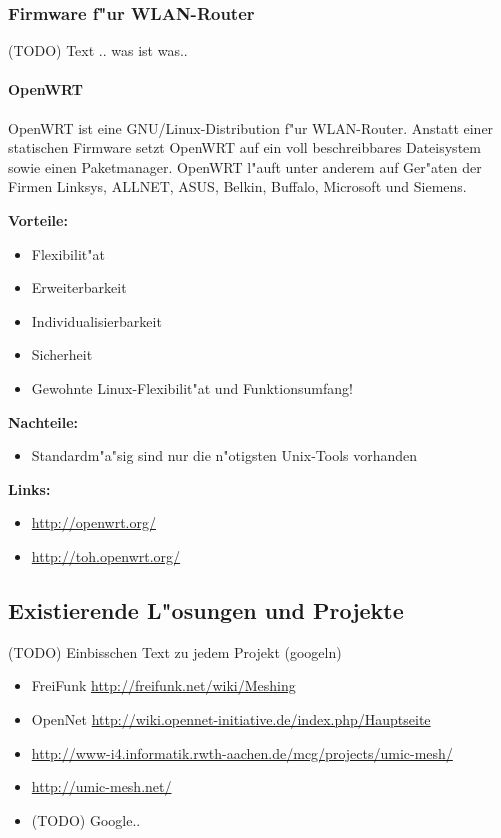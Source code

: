 \subsubsection{Firmware f"ur WLAN-Router}

(TODO) Text .. was ist was..

\paragraph{OpenWRT}

OpenWRT ist eine GNU/Linux-Distribution f"ur WLAN-Router. Anstatt einer
statischen Firmware setzt OpenWRT auf ein voll beschreibbares Dateisystem
sowie einen Paketmanager. OpenWRT l"auft unter anderem auf Ger"aten der
Firmen Linksys, ALLNET, ASUS, Belkin, Buffalo, Microsoft und Siemens.

\textbf{Vorteile:}

\begin{itemize}
	\item Flexibilit"at
	\item Erweiterbarkeit
	\item Individualisierbarkeit
	\item Sicherheit
	\item Gewohnte Linux-Flexibilit"at und Funktionsumfang! 
\end{itemize}

\textbf{Nachteile:}

\begin{itemize}
	\item Standardm"a"sig sind nur die n"otigsten Unix-Tools vorhanden 
\end{itemize}

\textbf{Links:}

\begin{itemize}
	\item \url{http://openwrt.org/}
	\item \url{http://toh.openwrt.org/}
\end{itemize}

\subsection{Existierende L"osungen und Projekte}

(TODO) Einbisschen Text zu jedem Projekt (googeln)

\begin{itemize}
\item FreiFunk \url{http://freifunk.net/wiki/Meshing}
\item OpenNet \url{http://wiki.opennet-initiative.de/index.php/Hauptseite}
\item \url{http://www-i4.informatik.rwth-aachen.de/mcg/projects/umic-mesh/} 
\item \url{http://umic-mesh.net/}
\item (TODO) Google..

\end{itemize}
